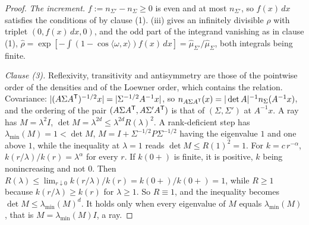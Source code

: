 \begin{proof}
\emph{The increment.} $f := n_{\Sigma'} - n_\Sigma \ge 0$ is even and at most $n_{\Sigma'}$, so
$f(x)\,dx$ satisfies the conditions of  by clause (1). (iii) gives an infinitely
divisible $\rho$ with triplet $(0, f(x)\,dx, 0)$, and the odd part of the integrand vanishing as in
clause (1), $\widehat\rho = \exp[-\int(1 - \cos\langle\omega,x\rangle)f(x)\,dx] =
\widehat\mu_{\Sigma'}/\widehat\mu_\Sigma$, both integrals being finite.

\emph{Clause (3).} Reflexivity, transitivity and antisymmetry are those of the pointwise order of
the densities and of the Loewner order, which contains the relation. Covariance: $|(A\Sigma A^{\mathsf{T}})^{-1/2}x|
= |\Sigma^{-1/2}A^{-1}x|$, so $n_{A\Sigma A^{\mathsf{T}}}(x) = |\det A|^{-1}n_\Sigma(A^{-1}x)$, and the
ordering of the pair $(A\Sigma A^{\mathsf{T}}, A\Sigma'A^{\mathsf{T}})$ is that of $(\Sigma,\Sigma')$ at $A^{-1}x$.
A ray has $M = \lambda^2I$, $\det M = \lambda^{2d} \le \lambda^{2d}R(\lambda)^2$. A rank-deficient step
has $\lambda_{\min}(M) = 1 < \det M$, $M = I + \Sigma^{-1/2}P\Sigma^{-1/2}$ having the eigenvalue $1$
and one above $1$, while the
inequality at $\lambda = 1$ reads $\det M \le R(1)^2 = 1$. For $k = c\,r^{-\alpha}$,
$k(r/\lambda)/k(r) = \lambda^\alpha$ for every $r$. If $k(0{+})$ is finite, it is positive, $k$ being
nonincreasing and not $0$. Then $R(\lambda) \le \lim_{r\downarrow0}k(r/\lambda)/k(r) = k(0{+})/k(0{+})
= 1$, while $R \ge 1$ because $k(r/\lambda) \ge k(r)$ for $\lambda \ge 1$. So $R \equiv 1$, and the inequality
becomes $\det M \le \lambda_{\min}(M)^d$. It holds only when every eigenvalue of $M$ equals $\lambda_{\min}(M)$, that
is $M = \lambda_{\min}(M)I$, a ray.
\end{proof}

